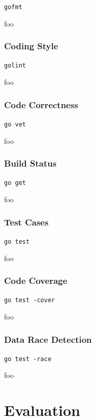 \documentclass[12pt, a4paper]{article}
\begin{document}
\texttt{gofmt}

foo

\subsubsection{Coding Style}

\texttt{golint}

foo

\subsubsection{Code Correctness}

\texttt{go vet}

foo

\subsubsection{Build Status}

\texttt{go get}

foo

\subsubsection{Test Cases}

\texttt{go test}

foo

\subsubsection{Code Coverage}

\texttt{go test -cover}

foo

\subsubsection{Data Race Detection}

\texttt{go test -race}

foo

\pagebreak



\section{Evaluation}
\end{document}

